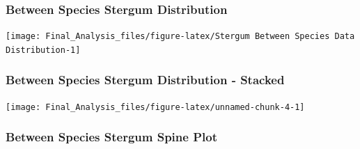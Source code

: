 \subsubsection{Between Species Stergum
Distribution}\label{between-species-stergum-distribution}

\begin{Shaded}
\begin{Highlighting}[]
\NormalTok{(}\NormalTok{(}\NormalTok{,}\NormalTok{))}
\NormalTok{(sternite$STERGUM[sternite$SPECIES==}\NormalTok{], }\NormalTok{, }\NormalTok{)}
\NormalTok{(sternite$STERGUM[sternite$SPECIES==}\NormalTok{], }\NormalTok{, }\NormalTok{)}
\end{Highlighting}
\end{Shaded}

\begin{center}\texttt{[image: Final\_Analysis\_files/figure-latex/Stergum Between Species Data Distribution-1]} \end{center}

\subsubsection{Between Species Stergum Distribution -
Stacked}\label{between-species-stergum-distribution---stacked}

\begin{Shaded}
\begin{Highlighting}[]
\NormalTok{, }\NormalTok{, }\NormalTok{, }\NormalTok{, }\NormalTok{)}
\end{Highlighting}
\end{Shaded}

\begin{center}\texttt{[image: Final\_Analysis\_files/figure-latex/unnamed-chunk-4-1]} \end{center}

\subsubsection{Between Species Stergum Spine
Plot}\label{between-species-stergum-spine-plot}

